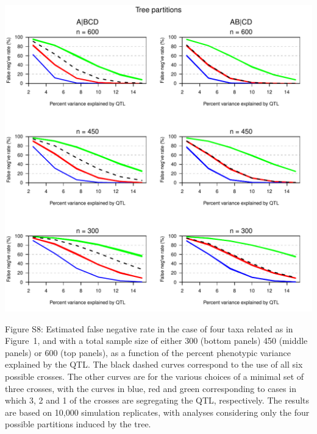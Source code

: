 \documentclass[letterpaper,twoside]{article}
\begin{document}
\newpage

{\centering
\includegraphics{SuppFigs/ns_treepart.pdf}}

\bigskip \noindent
Figure S8: Estimated false negative rate in the case of four taxa related as in
  Figure~1, and with a total sample size of either 300 (bottom panels)
  450 (middle panels) or 600 (top panels), as a function of the
  percent phenotypic variance explained by the QTL.  The black dashed
  curves correspond to the use of all six possible crosses.  The other
  curves are for the various choices of a minimal set of three
  crosses, with the curves in blue, red and green corresponding to
  cases in which 3, 2 and 1 of the crosses are segregating the QTL,
  respectively.  The results are based on 10,000 simulation
  replicates, with analyses considering only the four possible
  partitions induced by the tree.

\newpage
\end{document}
